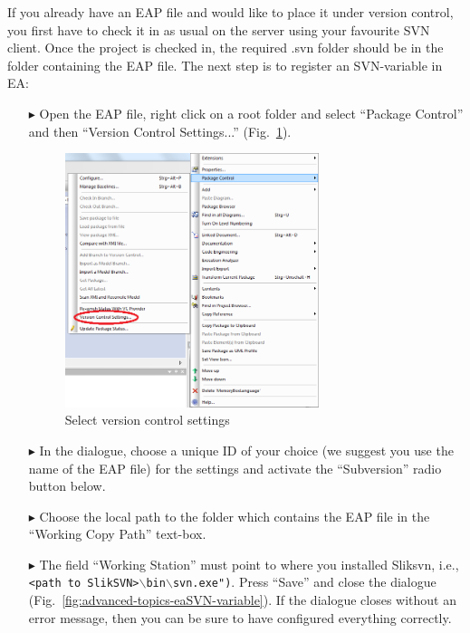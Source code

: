 If you already have an EAP file and would like to place it under version control, you first have to check it in as usual on the server using your favourite SVN
client. Once the project is checked in, the required .svn folder should be in the folder containing the EAP file. The next step is to register an SVN-variable
in EA:

\begin{enumerate}
  \item[$\blacktriangleright$] Open the EAP file, right click on a root folder and select ``Package Control'' and then ``Version Control Settings...''
  (Fig.~\ref{fig:advanced-topics-eaSVN-rightclick}).
  
\begin{figure}[!htbp]
\begin{center}
 	\includegraphics[width=0.7\textwidth]{rightclick}
	\caption{Select version control settings}
  	\label{fig:advanced-topics-eaSVN-rightclick}
\end{center}
\end{figure}

  \item[$\blacktriangleright$] In the dialogue, choose a unique ID of your choice (we suggest you use the name of the EAP file) for the settings and activate
  the ``Subversion'' radio button below.
  \item[$\blacktriangleright$] Choose the local path to the folder which contains the EAP file in the ``Working Copy Path'' text-box.
  \item[$\blacktriangleright$] The field ``Working Station'' must point to where you installed Sliksvn, i.e., \texttt{<path to
  SlikSVN>$\backslash$bin$\backslash$svn.exe")}. Press ``Save'' and close the dialogue (Fig.~\ref{fig:advanced-topics-eaSVN-variable}). If the dialogue closes
  without an error message, then you can be sure to have configured everything correctly.


\end{enumerate}
